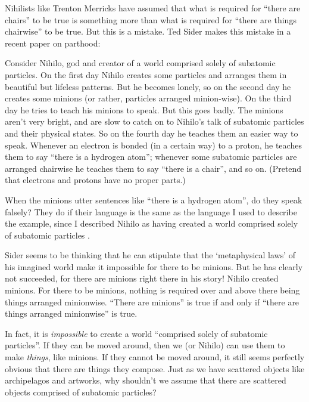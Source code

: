\documentclass[11pt]{article}
\newenvironment{squote}{%
\begin{spacing}{1}
       	\begin{list}{}{%
\setlength{\labelwidth}{0pt}%
\rightmargin\leftmargin%
}
\item\relax
}{%
\end{list}%
\end{spacing}
}
\begin{document}
\begin{spacing}{1.25}
Nihilists like Trenton Merricks have assumed that what is required for
``there are chairs'' to be true is something more than what is
required for ``there are things chairwise'' to be true.  But this is a
mistake.  Ted Sider makes this mistake in a recent paper on parthood:

\begin{squote}
Consider Nihilo, god and creator of a world comprised solely of
subatomic particles.  On the first day Nihilo creates some particles
and arranges them in beautiful but lifeless patterns.  But he becomes
lonely, so on the second day he creates some minions (or rather,
particles arranged minion-wise).  On the third day he tries to teach
his minions to speak.  But this goes badly.  The minions aren't very
bright, and are slow to catch on to Nihilo's talk of subatomic
particles and their physical states.  So on the fourth day he teaches
them an easier way to speak.  Whenever an electron is bonded (in a
certain way) to a proton, he teaches them to say ``there is a hydrogen
atom''; whenever some subatomic particles are arranged chairwise he
teaches them to say ``there is a chair'', and so on.  (Pretend that
electrons and protons have no proper parts.)

When the minions utter sentences like ``there is a hydrogen atom'', do
they speak falsely?  They do if their language is the same as the
language I used to describe the example, since I described Nihilo as
having created a world comprised solely of subatomic particles
\citeyearpar[7]{sider2011c}.
\end{squote}

Sider seems to be thinking that he can stipulate that the
`metaphysical laws' of his imagined world make it impossible for there
to be minions.  But he has clearly not succeeded, for there are
minions right there in his story!  Nihilo created minions.  For there
to be minions, nothing is required over and above there being things
arranged minionwise.  ``There are minions'' is true if and only if
``there are things arranged minionwise'' is true.

In fact, it is {\em impossible} to create a world ``comprised solely
of subatomic particles''.  If they can be moved around, then we (or
Nihilo) can use them to make {\em things}, like minions.  If they
cannot be moved around, it still seems perfectly obvious that there
are things they compose.  Just as we have scattered objects like
archipelagos and artworks, why shouldn't we assume that there are
scattered objects comprised of subatomic particles?


\end{spacing}
\end{document}
